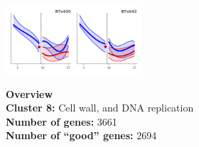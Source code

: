 \begin{multicols}{2}
\includegraphics[width=2in]{figures/clusters/root_Postflowering_7.png}
\columnbreak

\noindent \textbf{Overview}\\\textbf{Cluster 8:} Cell wall, and DNA replication \\
\textbf{Number of genes:} 3661 \\
\textbf{Number of ``good'' genes:} 2694 \\
\end{multicols}


